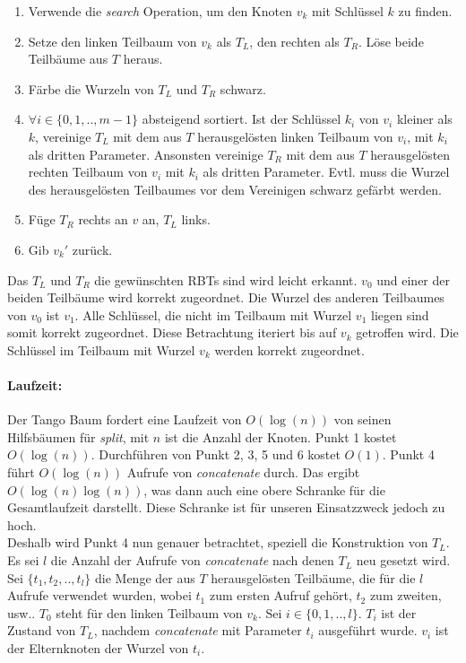 \documentclass[a4paper,12pt]{article}
\begin{document}
\begin{enumerate}
	\item Verwende die \textit{search} Operation, um den Knoten $v_k$ mit Schlüssel $k$ zu finden.
	\item Setze den linken Teilbaum von $v_k$ als $T_L$, den rechten als $T_R$. Löse beide Teilbäume aus $T$ heraus.
	\item Färbe die Wurzeln von $T_L$ und $T_R$ schwarz.
	\item $\forall i \in \{0,1,..,m-1\}$ absteigend sortiert. Ist der Schlüssel $k_i$ von $v_i$ kleiner als $k$, vereinige $T_L$ mit dem aus $T$ herausgelösten linken Teilbaum von $v_i$, mit  $k_i$ als dritten Parameter. Ansonsten vereinige $T_R$ mit dem aus $T$ herausgelösten rechten Teilbaum von $v_i$ mit  $k_i$ als dritten Parameter. Evtl. muss die Wurzel des herausgelösten Teilbaumes vor dem Vereinigen schwarz gefärbt werden. 
	\item Füge $T_R$ rechts an $v$ an, $T_L$ links.
	\item Gib ${v_k}'$ zurück.
\end{enumerate}   
Das $T_L$ und $T_R$ die gewünschten RBTs sind wird leicht erkannt. $v_0$ und einer der beiden Teilbäume wird korrekt zugeordnet. Die Wurzel des anderen Teilbaumes von $v_0$ ist $v_{1}$. Alle Schlüssel, die nicht im Teilbaum mit Wurzel $v_{1}$ liegen sind somit korrekt zugeordnet. Diese Betrachtung iteriert bis auf $v_k$ getroffen wird. Die Schlüssel im Teilbaum mit Wurzel $v_k$ werden korrekt zugeordnet. 

\paragraph{Laufzeit:}
Der Tango Baum fordert eine Laufzeit von $O(\log(n))$ von seinen Hilfsbäumen für \textit{split}, mit $n$ ist die Anzahl der Knoten. Punkt 1 kostet $O(\log(n))$. Durchführen von Punkt 2, 3, 5 und 6 kostet $O(1)$. Punkt 4 führt $O(\log (n))$ Aufrufe von \textit{concatenate} durch. Das ergibt $O(\log (n) \log (n))$, was dann auch eine obere Schranke für die Gesamtlaufzeit darstellt. Diese Schranke ist für unseren Einsatzzweck jedoch zu hoch.\\ Deshalb wird Punkt 4 nun genauer betrachtet, speziell die Konstruktion von $T_L$. Es sei $l$ die Anzahl der Aufrufe von \textit{concatenate} nach denen $T_L$ neu gesetzt wird. Sei $\{t_1,t_2,..,t_l\}$ die Menge der aus $T$ herausgelösten Teilbäume, die für die $l$ Aufrufe verwendet wurden, wobei $t_1$ zum ersten Aufruf gehört, $t_2$ zum zweiten, usw.. $T_0$ steht für den linken Teilbaum von $v_k$.  Sei $i \in \{0, 1, .., l\}$. $T_i$ ist der Zustand von $T_L$, nachdem \textit{concatenate} mit Parameter $t_i$ ausgeführt wurde. $v_i$ ist der Elternknoten der Wurzel von $t_i$.\\
\end{document}
